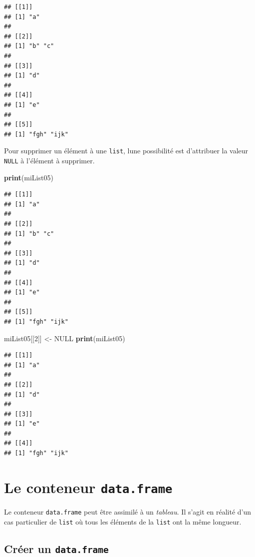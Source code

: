 \documentclass[
]{book}
\newenvironment{Shaded}{\begin{snugshade}}{\end{snugshade}}
\newcommand{\DecValTok}[1]{\textcolor[rgb]{0.00,0.00,0.81}{#1}}
\newcommand{\KeywordTok}[1]{\textcolor[rgb]{0.13,0.29,0.53}{\textbf{#1}}}
\newcommand{\NormalTok}[1]{#1}
\newcommand{\OtherTok}[1]{\textcolor[rgb]{0.56,0.35,0.01}{#1}}
\newcommand{\StringTok}[1]{\textcolor[rgb]{0.31,0.60,0.02}{#1}}
\begin{document}
\begin{verbatim}
## [[1]]
## [1] "a"
## 
## [[2]]
## [1] "b" "c"
## 
## [[3]]
## [1] "d"
## 
## [[4]]
## [1] "e"
## 
## [[5]]
## [1] "fgh" "ijk"
\end{verbatim}

Pour supprimer un élément à une \texttt{list}, lune possibilité est d'attribuer la valeur \texttt{NULL} à l'élément à supprimer.

\begin{Shaded}
\begin{Highlighting}[]
\KeywordTok{print}\NormalTok{(miList05)}
\end{Highlighting}
\end{Shaded}

\begin{verbatim}
## [[1]]
## [1] "a"
## 
## [[2]]
## [1] "b" "c"
## 
## [[3]]
## [1] "d"
## 
## [[4]]
## [1] "e"
## 
## [[5]]
## [1] "fgh" "ijk"
\end{verbatim}

\begin{Shaded}
\begin{Highlighting}[]
\NormalTok{miList05[[}\DecValTok{2}\NormalTok{]] <-}\StringTok{ }\OtherTok{NULL}
\KeywordTok{print}\NormalTok{(miList05)}
\end{Highlighting}
\end{Shaded}

\begin{verbatim}
## [[1]]
## [1] "a"
## 
## [[2]]
## [1] "d"
## 
## [[3]]
## [1] "e"
## 
## [[4]]
## [1] "fgh" "ijk"
\end{verbatim}

\hypertarget{l014dataframe}{%
\section{\texorpdfstring{Le conteneur \texttt{data.frame}}{Le conteneur data.frame}}\label{l014dataframe}}

Le conteneur \texttt{data.frame} peut être assimilé à un \emph{tableau}. Il s'agit en réalité d'un cas particulier de \texttt{list} où tous les éléments de la \texttt{list} ont la même longueur.

\hypertarget{cruxe9er-un-data.frame}{%
\subsection{\texorpdfstring{Créer un \texttt{data.frame}}{Créer un data.frame}}\label{cruxe9er-un-data.frame}}
\end{document}
